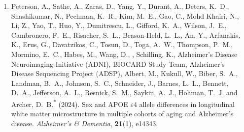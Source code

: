 \begin{enumerate}[resume=journalpubs]
\begin{pubentry}
\par\end{pubentry}
\item\begin{pubentry} Peterson, A., Sathe, A., Zaras, D., Yang, Y., Durant, A., Deters, K.\ D., Shashikumar, N., Pechman, K.\ R., Kim, M.\ E., Gao, C., Mohd Khairi, N., Li, Z., Yao, T., Huo, Y., Dumitrescu, L., Gifford, K.\ A., Wilson, J.\ E., Cambronero, F.\ E., Risacher, S.\ L., Beason-Held, L.\ L., An, Y., Arfanakis, K., Erus, G., Davatzikos, C., Tosun, D., Toga, A.\ W., Thompson, P.\ M., Mormino, E.\ C., Habes, M., Wang, D., \PZnot{}, Schilling, K., Alzheimer's Disease Neuroimaging Initiative (ADNI), BIOCARD Study Team, Alzheimer's Disease Sequencing Project (ADSP), Albert, M., Kukull, W., Biber, S.\ A., Landman, B.\ A., Johnson, S.\ C., Schneider, J., Barnes, L.\ L., Bennett, D.\ A., Jefferson, A.\ L., Resnick, S.\ M., Saykin, A.\ J., Hohman, T.\ J. and Archer, D.\ B.\textsuperscript{*} (2024). Sex and APOE $\varepsilon$4 allele differences in longitudinal white matter microstructure in multiple cohorts of aging and Alzheimer's disease. \emph{Alzheimer's \& Dementia}, \textbf{21}(1), e14343.

\par\end{pubentry}
\end{enumerate}
